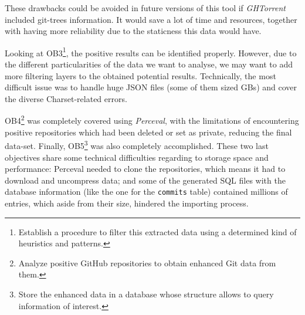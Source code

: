 \documentclass[a4paper, 12pt]{book}
\begin{document}
These drawbacks could be avoided in future versions of this tool if \emph{GHTorrent} included git-trees information. It would save a lot of time and resources,
together with having more reliability due to the staticness this data would have.\par
Looking at OB3\footnote{Establish a procedure to filter this extracted data using a determined kind of heuristics and patterns.},
the positive results can be identified properly. However, due to the different particularities of the data
we want to analyse, we may want to add more filtering layers to the obtained potential results. Technically,
the most difficult issue was to handle huge JSON files (some of them sized GBs) and cover the diverse Charset-related
errors.\par
OB4\footnote{Analyze positive GitHub repositories to obtain enhanced Git data from them.}
was completely covered using \emph{Perceval}, with the limitations of encountering positive repositories which had been deleted
or set as private, reducing the final data-set.
Finally, OB5\footnote{Store the enhanced data in a database whose structure allows to query information of interest.}
was also completely accomplished. These two last objectives
share some technical difficulties regarding to storage space and performance: Perceval needed to clone the repositories,
which means it had to download and uncompress data; and some of the generated SQL files with the database information
(like the one for the \texttt{commits} table) contained millions of entries, which aside from their size, hindered
the importing process.\par
\end{document}

